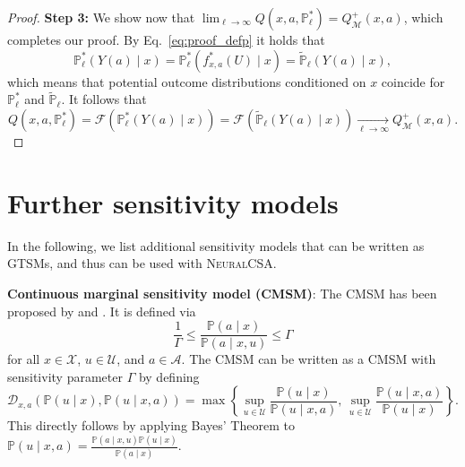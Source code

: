 \documentclass{article} %
\newcommand{\frameworkname}{\textsc{NeuralCSA}\xspace}
\theoremstyle{definition}
\theoremstyle{plain}
\begin{document}
\begin{proof}
\textbf{Step 3:} We show now that $\lim_{{\ell \to \infty}} Q(x, a, \mathbb{P}_\ell^\ast) = Q^+_\mathcal{M}(x, a)$, which completes our proof.
By Eq.~\eqref{eq:proof_defp} it holds that
\begin{equation}
\mathbb{P}^\ast_\ell(Y(a) \mid x) = \mathbb{P}_\ell^\ast(f^\ast_{x, a}(U) \mid x)  = \widetilde{\mathbb{P}}_\ell(Y(a) \mid x),
\end{equation}
which means that potential outcome distributions conditioned on $x$ coincide for $\mathbb{P}^\ast_\ell$ and $\widetilde{\mathbb{P}}_\ell$. It follows that
\begin{equation}
    Q(x, a, \mathbb{P}_\ell^\ast) = \mathcal{F}\left( \mathbb{P}^\ast_\ell(Y(a) \mid x)\right) = \mathcal{F}\left( \widetilde{\mathbb{P}}_\ell(Y(a) \mid x)\right) \xrightarrow[\ell \to \infty]{}  Q^+_\mathcal{M}(x, a).
\end{equation}

\end{proof}


\clearpage

\section{Further sensitivity models}\label{app:sensitivity}

In the following, we list additional sensitivity models that can be written as GTSMs, and thus can be used with \frameworkname.

\textbf{Continuous marginal sensitivity model (CMSM)}: The CMSM has been proposed by \citet{Jesson.2022} and \citet{Bonvini.2022}. It is defined via
\begin{equation}
\frac{1}{\Gamma} \leq  \frac{\mathbb{P}(a\mid x)}{\mathbb{P}(a \mid x, u)} \leq \Gamma
\end{equation}
for all $x \in \mathcal{X}$, $u \in \mathcal{U}$, and $a \in \mathcal{A}$. The CMSM can be written as a CMSM with sensitivity parameter $\Gamma$ by defining 
\begin{equation}
\mathcal{D}_{x,a}(\mathbb{P}(u \mid x), \mathbb{P}(u \mid x, a)) = \max\left\{\sup_{u \in \mathcal{U}} \frac{\mathbb{P}(u \mid x)}{\mathbb{P}(u \mid x, a)}, \, \sup_{u \in \mathcal{U}} \frac{\mathbb{P}(u \mid x, a)}{\mathbb{P}(u \mid x)} \right\}.
\end{equation}
This directly follows by applying Bayes' Theorem to $\mathbb{P}(u \mid x, a) = \frac{\mathbb{P}(a \mid x, u) \mathbb{P}(u \mid x)}{\mathbb{P}(a \mid x)}$.
\end{document}
